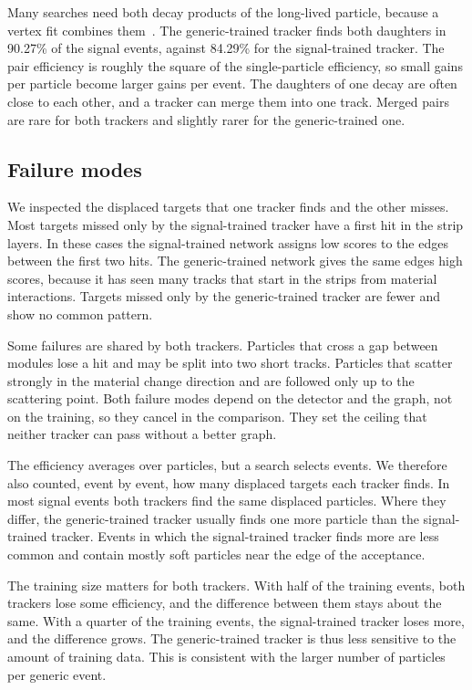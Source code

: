 Many searches need both decay products of the long-lived particle, because a vertex fit combines
them~\cite{Fischer2022Vertexing}. The generic-trained tracker finds both daughters in 90.27\% of the
signal events, against 84.29\% for the signal-trained tracker. The pair efficiency is roughly the
square of the single-particle efficiency, so small gains per particle become larger gains per event.
The daughters of one decay are often close to each other, and a tracker can merge them into one
track. Merged pairs are rare for both trackers and slightly rarer for the generic-trained one.

\subsection{Failure modes}
\label{sec:failures}

We inspected the displaced targets that one tracker finds and the other misses. Most targets missed
only by the signal-trained tracker have a first hit in the strip layers. In these cases the
signal-trained network assigns low scores to the edges between the first two hits. The
generic-trained network gives the same edges high scores, because it has seen many tracks that start
in the strips from material interactions. Targets missed only by the generic-trained tracker are
fewer and show no common pattern.

Some failures are shared by both trackers. Particles that cross a gap between modules lose a hit and
may be split into two short tracks. Particles that scatter strongly in the material change direction
and are followed only up to the scattering point. Both failure modes depend on the detector and the
graph, not on the training, so they cancel in the comparison. They set the ceiling that neither
tracker can pass without a better graph.

The efficiency averages over particles, but a search selects events. We therefore also counted,
event by event, how many displaced targets each tracker finds. In most signal events both trackers
find the same displaced particles. Where they differ, the generic-trained tracker usually finds one
more particle than the signal-trained tracker. Events in which the signal-trained tracker finds more
are less common and contain mostly soft particles near the edge of the acceptance.

The training size matters for both trackers. With half of the training events, both trackers lose
some efficiency, and the difference between them stays about the same. With a quarter of the
training events, the signal-trained tracker loses more, and the difference grows. The
generic-trained tracker is thus less sensitive to the amount of training data. This is consistent
with the larger number of particles per generic event.

